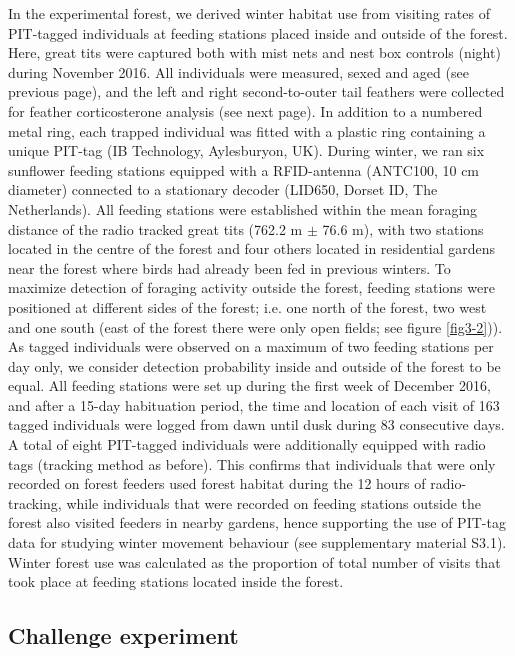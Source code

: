 \documentclass[10pt, twoside]{book} %
\begin{document}
In the experimental forest, we derived winter habitat use from visiting rates of PIT-tagged individuals at feeding stations placed inside and outside of the forest. Here, great tits were captured both with mist nets and nest box controls (night) during November 2016. All individuals were measured, sexed and aged (see previous page), and the left and right second-to-outer tail feathers were collected for feather corticosterone analysis (see next page). In addition to a numbered metal ring, each trapped individual was fitted with a plastic ring containing a unique PIT-tag (IB Technology, Aylesburyon, UK). During winter, we ran six sunflower feeding stations equipped with a RFID-antenna (ANTC100, 10 cm diameter) connected to a stationary decoder (LID650, Dorset ID, The Netherlands). All feeding stations were established within the mean foraging distance of the radio tracked great tits (762.2 m $\pm$ 76.6 m), with two stations located in the centre of the forest and four others located in residential gardens near the forest where birds had already been fed in previous winters. To maximize detection of foraging activity outside the forest, feeding stations were positioned at different sides of the forest; i.e. one north of the forest, two west and one south (east of the forest there were only open fields; see figure \ref{fig3-2})). As tagged individuals were observed on a maximum of two feeding stations per day only, we consider detection probability inside and outside of the forest to be equal. All feeding stations were set up during the first week of December 2016, and after a 15-day habituation period, the time and location of each visit of 163 tagged individuals were logged from dawn until dusk during 83 consecutive days. A total of eight PIT-tagged individuals were additionally equipped with radio tags (tracking method as before). This confirms that individuals that were only recorded on forest feeders used forest habitat during the 12 hours of radio-tracking, while individuals that were recorded on feeding stations outside the forest also visited feeders in nearby gardens, hence supporting the use of PIT-tag data for studying winter movement behaviour (see supplementary material S3.1). Winter forest use was calculated as the proportion of total number of visits that took place at feeding stations located inside the forest.

	
	
	
	\subsection*{Challenge experiment}
	
\end{document}
